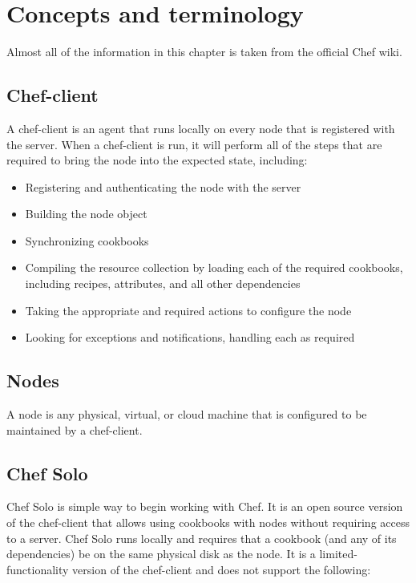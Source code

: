 \section{Concepts and terminology}

Almost all of the information in this chapter is taken from the official Chef wiki\cite{chef_wiki}.

\subsection{Chef-client}

A chef-client is an agent that runs locally on every node that is registered with the server. When a chef-client is run, it will perform all of the steps that are required to bring the node into the expected state, including:

\begin{itemize}
  \item Registering and authenticating the node with the server
  \item Building the node object
  \item Synchronizing cookbooks
  \item Compiling the resource collection by loading each of the required cookbooks, including recipes, attributes, and all other dependencies
  \item Taking the appropriate and required actions to configure the node
  \item Looking for exceptions and notifications, handling each as required
\end{itemize}

\subsection{Nodes}

A node is any physical, virtual, or cloud machine that is configured to be maintained by a chef-client.

\subsection{Chef Solo}

Chef Solo is simple way to begin working with Chef. It is an open source version of the chef-client that allows using cookbooks with nodes without requiring access to a server. Chef Solo runs locally and requires that a cookbook (and any of its dependencies) be on the same physical disk as the node. It is a limited-functionality version of the chef-client and does not support the following:

